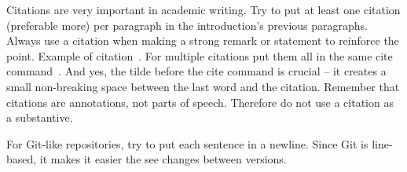 Citations are very important in academic writing. 
Try to put at least one citation (preferable more) per paragraph in the introduction's previous paragraphs. 
Always use a citation when making a strong remark or statement to reinforce the point.
Example of citation~\cite{demeyer2002}.
For multiple citations put them all in the same cite command~\cite{vanbladel2020, parsai2020, njima2019, demeyer2002}. 
And yes, the tilde before the cite command is crucial -- it creates a small non-breaking space between the last word and the citation.
Remember that citations are annotations, not parts of speech.
Therefore do not use a citation as a substantive.

For Git-like repositories, try to put each sentence in a newline. 
Since Git is line-based, it makes it easier the see changes between versions.


